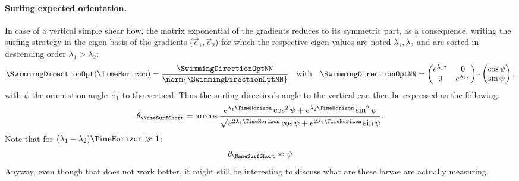 \paragraph{Surfing expected orientation.}
In case of a vertical simple shear flow, the matrix exponential of the gradients reduces to its symmetric part, as a consequence, writing the surfing strategy in the eigen basis of the gradients ($\vec{e}_1, \vec{e}_2$) for which the respective eigen values are noted $\lambda_1, \lambda_2$ and are sorted in descending order $\lambda_1 > \lambda_2$:
\begin{equation}
	\label{eq:optimal_swimming_direction_partial_asym}
	\SwimmingDirectionOpt(\TimeHorizon) = \frac{\SwimmingDirectionOptNN}{\norm{\SwimmingDirectionOptNN}} \quad \text{with} \quad \SwimmingDirectionOptNN = 
	\begin{pmatrix}
		e^{\lambda_1 \tau} & 0\\
		0 & e^{\lambda_2 \tau}
	\end{pmatrix} \cdot
	\begin{pmatrix}
		\cos \psi \\
		\sin \psi
	\end{pmatrix},
\end{equation}
with $\psi$ the orientation angle $\vec{e}_1$ to the vertical.
Thus the surfing direction's angle to the vertical can then be expressed as the following:
\begin{equation}\label{eq:surfing_orientation}
	\theta_{\mathrm{\NameSurfShort}} = \mathrm{arccos} \, \frac{e^{\lambda_1 \TimeHorizon} \cos^2 \psi + e^{\lambda_2 \TimeHorizon} \sin^2 \psi}{\sqrt{e^{2\lambda_1 \TimeHorizon} \cos \psi + e^{2\lambda_2 \TimeHorizon} \sin \psi}}.
\end{equation}
Note that for $(\lambda_1 - \lambda_2) \TimeHorizon \gg 1$:
\begin{equation}\label{eq:surfing_orientation}
	\theta_{\mathrm{\NameSurfShort}} \approx \psi
\end{equation}
Anyway, even though that does not work better, it might still be interesting to discuss what are these larvae are actually measuring.

